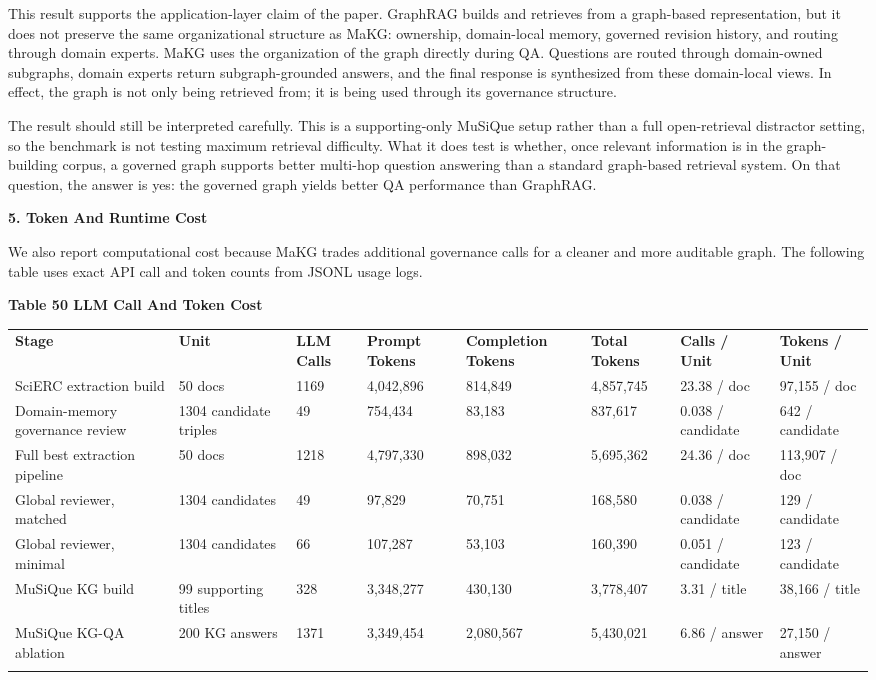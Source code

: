 This result supports the application-layer claim of the paper. GraphRAG
builds and retrieves from a graph-based representation, but it does not
preserve the same organizational structure as MaKG: ownership,
domain-local memory, governed revision history, and routing through
domain experts. MaKG uses the organization of the graph directly during
QA. Questions are routed through domain-owned subgraphs, domain experts
return subgraph-grounded answers, and the final response is synthesized
from these domain-local views. In effect, the graph is not only being
retrieved from; it is being used through its governance structure.

The result should still be interpreted carefully. This is a
supporting-only MuSiQue setup rather than a full open-retrieval
distractor setting, so the benchmark is not testing maximum retrieval
difficulty. What it does test is whether, once relevant information is
in the graph-building corpus, a governed graph supports better multi-hop
question answering than a standard graph-based retrieval system. On that
question, the answer is yes: the governed graph yields better QA
performance than GraphRAG.

\textbf{5. Token And Runtime Cost}

We also report computational cost because MaKG trades additional
governance calls for a cleaner and more auditable graph. The following
table uses exact API call and token counts from JSONL usage logs.

\textbf{Table 50 LLM Call And Token Cost}

{\def\LTcaptype{none} %
\begin{longtable}[]{@{}llllllll@{}}
\toprule\noalign{}
\textbf{Stage} & \textbf{Unit} & \textbf{LLM Calls} & \textbf{Prompt
Tokens} & \textbf{Completion Tokens} & \textbf{Total Tokens} &
\textbf{Calls / Unit} & \textbf{Tokens / Unit} \\
SciERC extraction build & 50 docs & 1169 & 4,042,896 & 814,849 &
4,857,745 & 23.38 / doc & 97,155 / doc \\
Domain-memory governance review & 1304 candidate triples & 49 & 754,434
& 83,183 & 837,617 & 0.038 / candidate & 642 / candidate \\
Full best extraction pipeline & 50 docs & 1218 & 4,797,330 & 898,032 &
5,695,362 & 24.36 / doc & 113,907 / doc \\
Global reviewer, matched & 1304 candidates & 49 & 97,829 & 70,751 &
168,580 & 0.038 / candidate & 129 / candidate \\
Global reviewer, minimal & 1304 candidates & 66 & 107,287 & 53,103 &
160,390 & 0.051 / candidate & 123 / candidate \\
MuSiQue KG build & 99 supporting titles & 328 & 3,348,277 & 430,130 &
3,778,407 & 3.31 / title & 38,166 / title \\
MuSiQue KG-QA ablation & 200 KG answers & 1371 & 3,349,454 & 2,080,567 &
5,430,021 & 6.86 / answer & 27,150 / answer \\
\midrule\noalign{}
\endhead
\bottomrule\noalign{}
\endlastfoot
\end{longtable}
}


